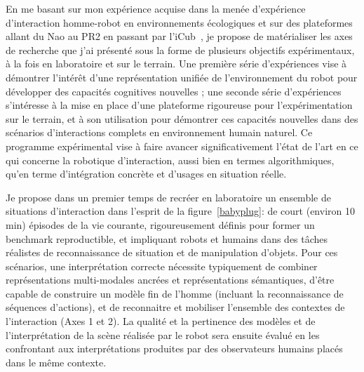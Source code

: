 \documentclass[a4paper]{article}
\begin{document}
En me basant sur mon expérience acquise dans la menée d'expérience d'interaction
homme-robot en environnements écologiques et sur des plateformes allant du Nao
au PR2 en passant par
l'iCub~\cite{lemaignan2010oro,ros2010which,lallee2011towards,lemaignan2012roboscopie,warnier2012when,hood2015when},
je propose de matérialiser les axes de recherche que j'ai présenté sous la forme
de plusieurs objectifs expérimentaux, à la fois en laboratoire et sur le
terrain.  Une première série d'expériences vise à démontrer l'intérêt d'une
représentation unifiée de l'environnement du robot pour développer des capacités
cognitives nouvelles ; une seconde série d'expériences s'intéresse à la mise en
place d'une plateforme rigoureuse pour l'expérimentation sur le terrain, et à
son utilisation pour démontrer ces capacités nouvelles dans des scénarios
d'interactions complets en environnement humain naturel. Ce programme
expérimental vise à faire avancer significativement l'état de l'art en ce qui
concerne la robotique d'interaction, aussi bien en termes algorithmiques, qu'en
terme d'intégration concrète et d'usages en situation réelle.

Je propose dans un premier temps de recréer en laboratoire un ensemble de
situations d'interaction dans l'esprit de la figure~\ref{babyplug}: de court
(environ 10 min) épisodes de la vie courante, rigoureusement définis pour former
un benchmark reproductible, et impliquant robots et humains dans des tâches
réalistes de reconnaissance de situation et de manipulation d'objets. Pour ces
scénarios, une interprétation correcte nécessite typiquement de combiner
représentations multi-modales ancrées et représentations sémantiques, d'être
capable de construire un modèle fin de l'homme (incluant la reconnaissance de
séquences d'actions), et de reconnaitre et mobiliser l'ensemble des contextes de
l'interaction (Axes 1 et 2). La qualité et la pertinence des modèles et de
l'interprétation de la scène réalisée par le robot sera ensuite évalué en les
confrontant aux interprétations produites par des observateurs humains placés
dans le même contexte.
\end{document}
